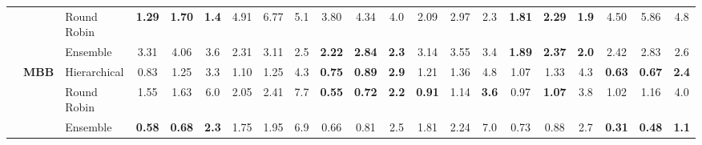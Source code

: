 {\begin{longtable}{@{\extracolsep{\fill}}lllccc|ccc|ccc|ccc|ccc|ccc}
 &  & Round Robin & \cellcolor{colorrr}\textbf{1.29} & \cellcolor{colorrr}\textbf{1.70} & \cellcolor{colorrr}\textbf{1.4} & 4.91 & 6.77 & 5.1 & 3.80 & 4.34 & 4.0 & 2.09 & 2.97 & 2.3 & \cellcolor{colorrr}\textbf{1.81} & \cellcolor{colorrr}\textbf{2.29} & \cellcolor{colorrr}\textbf{1.9} & 4.50 & 5.86 & 4.8 \\
 &  & Ensemble & 3.31 & 4.06 & 3.6 & \cellcolor{colorens}2.31 & \cellcolor{colorens}3.11 & \cellcolor{colorens}2.5 & \cellcolor{colorens}\textbf{2.22} & \cellcolor{colorens}\textbf{2.84} & \cellcolor{colorens}\textbf{2.3} & 3.14 & 3.55 & 3.4 & \textbf{1.89} & \textbf{2.37} & \textbf{2.0} & \cellcolor{colorens}2.42 & \cellcolor{colorens}2.83 & \cellcolor{colorens}2.6 \\
\cmidrule(lr){2-21}
 & \multirow{3}{*}{\textbf{MBB}} & Hierarchical & 0.83 & 1.25 & 3.3 & \cellcolor{colorhier}1.10 & \cellcolor{colorhier}1.25 & \cellcolor{colorhier}4.3 & \textbf{0.75} & \textbf{0.89} & \textbf{2.9} & 1.21 & 1.36 & 4.8 & 1.07 & 1.33 & 4.3 & \textbf{0.63} & \textbf{0.67} & \textbf{2.4} \\
 &  & Round Robin & 1.55 & 1.63 & 6.0 & 2.05 & 2.41 & 7.7 & \cellcolor{colorrr}\textbf{0.55} & \cellcolor{colorrr}\textbf{0.72} & \cellcolor{colorrr}\textbf{2.2} & \cellcolor{colorrr}\textbf{0.91} & \cellcolor{colorrr}1.14 & \cellcolor{colorrr}\textbf{3.6} & 0.97 & \textbf{1.07} & 3.8 & 1.02 & 1.16 & 4.0 \\
 &  & Ensemble & \cellcolor{colorens}\textbf{0.58} & \cellcolor{colorens}\textbf{0.68} & \cellcolor{colorens}\textbf{2.3} & 1.75 & 1.95 & 6.9 & 0.66 & 0.81 & 2.5 & 1.81 & 2.24 & 7.0 & \cellcolor{colorens}0.73 & \cellcolor{colorens}0.88 & \cellcolor{colorens}2.7 & \cellcolor{colorens}\textbf{0.31} & \cellcolor{colorens}\textbf{0.48} & \cellcolor{colorens}\textbf{1.1} \\
\midrule


\end{longtable}}
